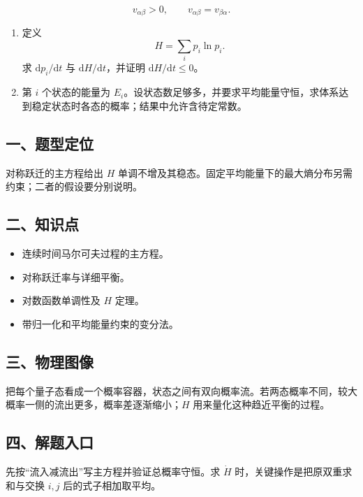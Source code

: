 \documentclass[12pt,a4paper,UTF8]{ctexart}
\newcommand{\tightlist}{\setlength{\itemsep}{0pt}\setlength{\parskip}{0pt}}
\begin{document}
\[v_{\alpha\beta}>0,\qquad v_{\alpha\beta}=v_{\beta\alpha}.\]

\begin{enumerate}
\def\labelenumi{\arabic{enumi}.}
\tightlist
\item
  定义 \[H=\sum_i p_i\ln p_i.\] 求 \(\mathrm dp_i/\mathrm dt\) 与
  \(\mathrm dH/\mathrm dt\)，并证明 \(\mathrm dH/\mathrm dt\leq0\)。
\item
  第 \(i\) 个状态的能量为
  \(E_i\)。设状态数足够多，并要求平均能量守恒，求体系达到稳定状态时各态的概率；结果中允许含待定常数。
\end{enumerate}

\subsection{一、题型定位}\label{ux4e00ux9898ux578bux5b9aux4f4d-7}

对称跃迁的主方程给出 \(H\)
单调不增及其稳态。固定平均能量下的最大熵分布另需约束；二者的假设要分别说明。

\subsection{二、知识点}\label{ux4e8cux77e5ux8bc6ux70b9-7}

\begin{itemize}
\tightlist
\item
  连续时间马尔可夫过程的主方程。
\item
  对称跃迁率与详细平衡。
\item
  对数函数单调性及 \(H\) 定理。
\item
  带归一化和平均能量约束的变分法。
\end{itemize}

\subsection{三、物理图像}\label{ux4e09ux7269ux7406ux56feux50cf-7}

把每个量子态看成一个概率容器，状态之间有双向概率流。若两态概率不同，较大概率一侧的流出更多，概率差逐渐缩小；\(H\)
用来量化这种趋近平衡的过程。

\subsection{四、解题入口}\label{ux56dbux89e3ux9898ux5165ux53e3-7}

先按``流入减流出''写主方程并验证总概率守恒。求 \(\dot H\)
时，关键操作是把原双重求和与交换 \(i,j\) 后的式子相加取平均。
\end{document}
